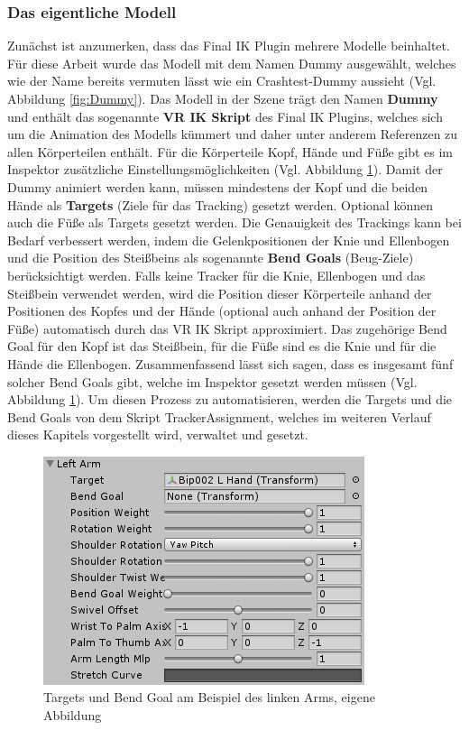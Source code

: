 \subsubsection{Das eigentliche Modell}\label{sec:MMModell}
Zunächst ist anzumerken, dass das Final IK Plugin mehrere Modelle beinhaltet. Für diese Arbeit wurde das Modell mit dem Namen Dummy ausgewählt, welches wie der Name bereits vermuten lässt wie ein Crashtest-Dummy aussieht (Vgl. Abbildung \ref{fig:Dummy}).
\newline\newline
Das Modell in der Szene trägt den Namen \textbf{Dummy} und enthält das sogenannte \textbf{VR IK Skript} des Final IK Plugins, welches sich um die Animation des Modells kümmert und daher unter anderem Referenzen zu allen Körperteilen enthält. Für die Körperteile Kopf, Hände und Füße gibt es im Inspektor zusätzliche Einstellungsmöglichkeiten (Vgl. Abbildung \ref{fig:TargetBendGoal}). Damit der Dummy animiert werden kann, müssen mindestens der Kopf und die beiden Hände als \textbf{Targets} (Ziele für das Tracking) gesetzt werden. Optional können auch die Füße als Targets gesetzt werden. 
Die Genauigkeit des Trackings kann bei Bedarf verbessert werden, indem die Gelenkpositionen der Knie und Ellenbogen und die Position des Steißbeins als sogenannte \textbf{Bend Goals} (Beug-Ziele) berücksichtigt werden. Falls keine Tracker für die Knie, Ellenbogen und das Steißbein verwendet werden, wird die Position dieser Körperteile anhand der Positionen des Kopfes und der Hände (optional auch anhand der Position der Füße) automatisch durch das VR IK Skript approximiert.
Das zugehörige Bend Goal für den Kopf ist das Steißbein, für die Füße sind es die Knie und für die Hände die Ellenbogen. Zusammenfassend lässt sich sagen, dass es insgesamt fünf solcher Bend Goals gibt, welche im Inspektor gesetzt werden müssen (Vgl. Abbildung \ref{fig:TargetBendGoal}).
Um diesen Prozess zu automatisieren, werden die Targets und die Bend Goals von dem Skript TrackerAssignment, welches im weiteren Verlauf dieses Kapitels vorgestellt wird, verwaltet und gesetzt.
\begin{figure}[h]
	\centering
	\includegraphics[width=0.35\linewidth]{Bilder/A36_TargetsBendGoals}
	\caption{Targets und Bend Goal am Beispiel des linken Arms, eigene Abbildung}
	\label{fig:TargetBendGoal}
\end{figure}
